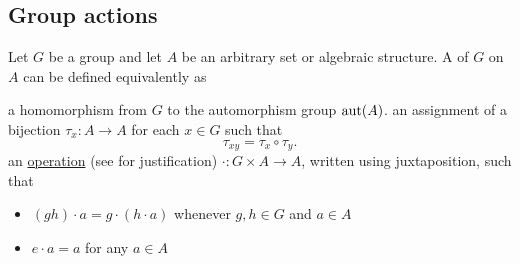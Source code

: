 \subsection{Group actions}\label{subsec:group_actions}

\begin{definition}\label{def:left_group_action}
  Let \( G \) be a group and let \( A \) be an arbitrary set or algebraic structure. A  of \( G \) on \( A \) can be defined equivalently as
  \begin{DefEnum}
     a homomorphism from \( G \) to the automorphism group \( \operatorname{aut}(A) \).
     an assignment of a bijection \( \tau_x: A \to A \) for each \( x \in G \) such that
    \begin{equation*}
      \tau_{xy} = \tau_x \circ \tau_y.
    \end{equation*}
     an \hyperref[def:algebraic_theory]{operation} (see  for justification) \( \cdot: G \times A \to A \), written using juxtaposition, such that
    \begin{itemize}
      \item \( (g h) \cdot a = g \cdot (h \cdot a) \) whenever \( g, h \in G \) and \( a \in A \)
      \item \( e \cdot a = a \) for any \( a \in A \)
    \end{itemize}
  \end{DefEnum}
\end{definition}
